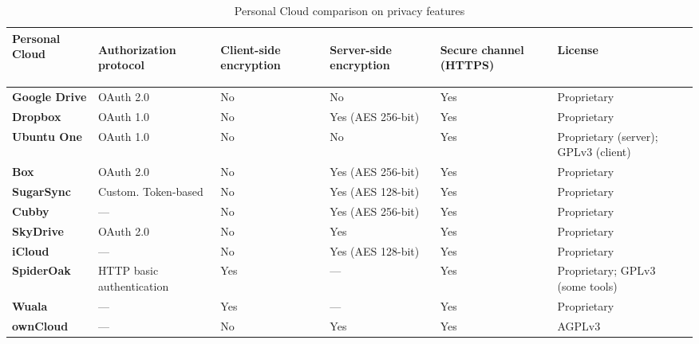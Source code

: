 {
\def\arraystretch{1.5}

\begin{table}
\begin{center}
    \begin{tabular}{ | p{3.3cm} | p{2.5cm} | p{1.2cm} | p{1.9cm} | p{1.2cm} | p{3.8cm} | }
    \hline
    \rowcolor[gray]{0.8}

	\textbf{Personal Cloud} &
	\begin{sideways}\textbf{Authorization protocol}\end{sideways} &
	\begin{sideways}\textbf{Client-side encryption}\end{sideways} &
	\begin{sideways}\textbf{Server-side encryption}\end{sideways} & 
	\begin{sideways}\textbf{Secure channel (HTTPS)}\end{sideways} &
	\begin{sideways}\textbf{License}\end{sideways} \\ \hline
	
	\textbf{Google Drive} &
	OAuth 2.0 &
	No &
	No &
	Yes &
	Proprietary \\ \hline

	\textbf{Dropbox} &
	OAuth 1.0 &
	No &
	Yes (AES 256-bit) &
	Yes &
	Proprietary \\ \hline
	
	\textbf{Ubuntu One} &
	OAuth 1.0 &
	No &
	No &
	Yes &
	Proprietary (server); GPLv3 (client) \\ \hline
	
	\textbf{Box} &
	OAuth 2.0 &
	No &
	Yes (AES 256-bit) &
	Yes &
	Proprietary \\ \hline
	
	\textbf{SugarSync} & 
	Custom. Token-based &
	No &
	Yes (AES 128-bit) &
	Yes &
	Proprietary \\ \hline
	
	\textbf{Cubby} &
	--- &
	No &
	Yes (AES 256-bit) &
	Yes &
	Proprietary \\ \hline
	
	\textbf{SkyDrive} & 
	OAuth 2.0 &
	No &
	Yes &
	Yes &
	Proprietary \\ \hline

	\textbf{iCloud} &
	--- &
	No &
	Yes (AES 128-bit) &
	Yes &
	Proprietary \\ \hline
	
	\textbf{SpiderOak} & 
	HTTP basic authentication &
	Yes &
	--- &
	Yes &
	Proprietary; GPLv3 (some tools) \\ \hline

	\textbf{Wuala} &
	--- &
	Yes &
	--- &
	Yes &
	Proprietary \\ \hline
	
	\textbf{ownCloud} &
	--- &
	No &
	Yes &
	Yes &
	AGPLv3 \\ \hline

    \end{tabular}
    \caption{Personal Cloud comparison on privacy features}
    \label{tab:pc_privacy}
\end{center}
\end{table}
}

